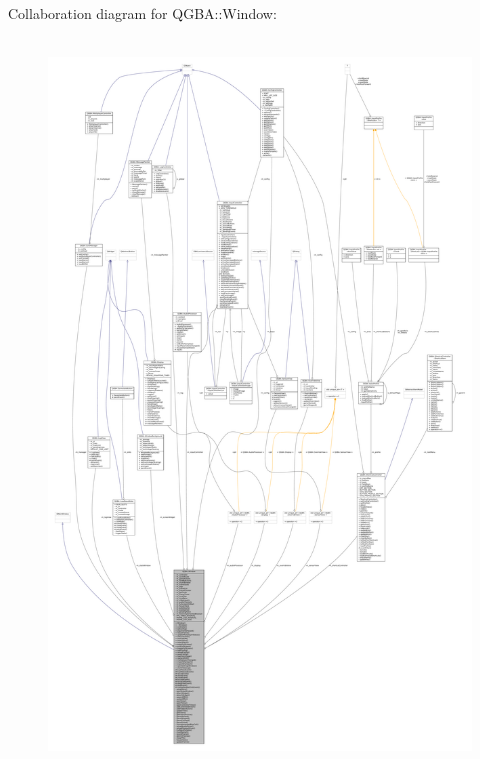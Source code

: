 Collaboration diagram for Q\+G\+BA\+:\+:Window\+:
\nopagebreak
\begin{figure}[H]
\begin{center}
\leavevmode
\includegraphics[height=550pt]{class_q_g_b_a_1_1_window__coll__graph}
\end{center}
\end{figure}
